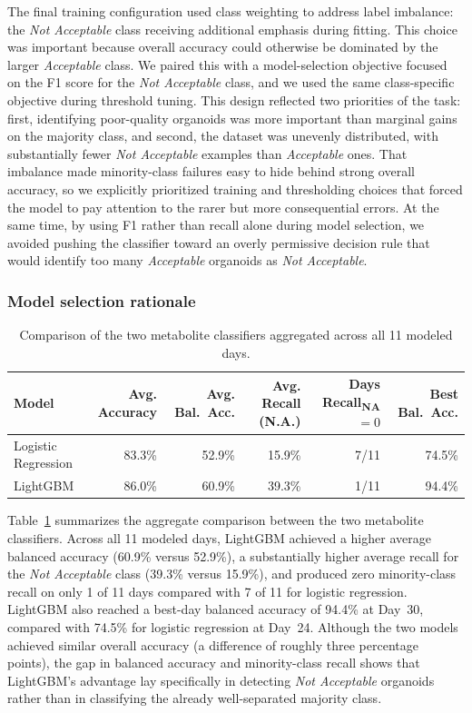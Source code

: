 \documentclass{article}
\begin{document}
The final training configuration used class weighting to address label imbalance: the \textit{Not Acceptable} class receiving additional emphasis during fitting. This choice was important because overall accuracy could otherwise be dominated by the larger \textit{Acceptable} class. We paired this with a model-selection objective focused on the F1 score for the \textit{Not Acceptable} class, and we used the same class-specific objective during threshold tuning. This design reflected two priorities of the task: first, identifying poor-quality organoids was more important than marginal gains on the majority class, and second, the dataset was unevenly distributed, with substantially fewer \textit{Not Acceptable} examples than \textit{Acceptable} ones. That imbalance made minority-class failures easy to hide behind strong overall accuracy, so we explicitly prioritized training and thresholding choices that forced the model to pay attention to the rarer but more consequential errors. At the same time, by using F1 rather than recall alone during model selection, we avoided pushing the classifier toward an overly permissive decision rule that would identify too many \textit{Acceptable} organoids as \textit{Not Acceptable}.

\subsubsection{Model selection rationale}

\begin{table}[H]
\centering
\renewcommand{\arraystretch}{1.4}
\begin{tabular}{|l|r|r|r|r|r|}
\hline
\textbf{Model} & \textbf{Avg. Accuracy} & \textbf{Avg. Bal.\ Acc.} & \textbf{Avg. Recall (N.A.)} & \textbf{Days Recall\textsubscript{NA}$= 0$} & \textbf{Best Bal.\ Acc.} \\
\hline
Logistic Regression & 83.3\% & 52.9\% & 15.9\% & 7/11 & 74.5\% \\
\hline
LightGBM            & 86.0\% & 60.9\% & 39.3\% & 1/11 & 94.4\% \\
\hline
\end{tabular}
\caption{Comparison of the two metabolite classifiers aggregated across all 11 modeled days.}
\label{tab:metabolite_model_comparison}
\end{table}

Table~\ref{tab:metabolite_model_comparison} summarizes the aggregate comparison between the two metabolite classifiers. Across all 11 modeled days, LightGBM achieved a higher average balanced accuracy (60.9\% versus 52.9\%), a substantially higher average recall for the \textit{Not Acceptable} class (39.3\% versus 15.9\%), and produced zero minority-class recall on only 1 of 11 days compared with 7 of 11 for logistic regression. LightGBM also reached a best-day balanced accuracy of 94.4\% at Day~30, compared with 74.5\% for logistic regression at Day~24. Although the two models achieved similar overall accuracy (a difference of roughly three percentage points), the gap in balanced accuracy and minority-class recall shows that LightGBM's advantage lay specifically in detecting \textit{Not Acceptable} organoids rather than in classifying the already well-separated majority class.
\end{document}
